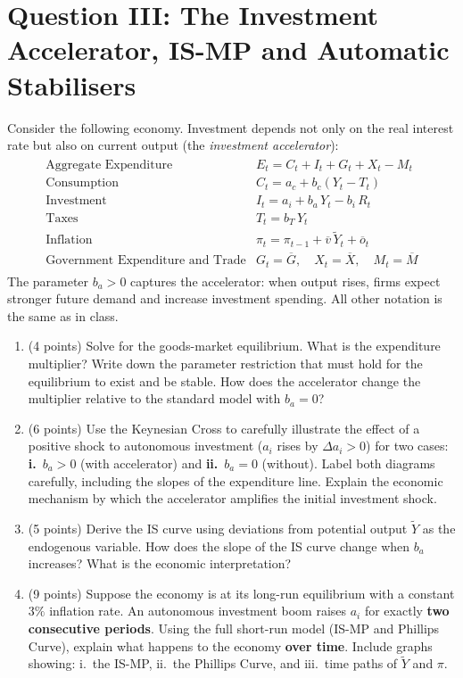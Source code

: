 \documentclass[letterpaper,12pt]{article}
\theoremstyle{dotlessS}
\begin{document}
\section*{Question III: The Investment Accelerator, IS-MP and Automatic Stabilisers}
Consider the following economy. Investment depends not only on the real interest rate but also on current output (the \emph{investment accelerator}):
\begin{eqnarray*}
\begin{array}{ll}
\text{Aggregate Expenditure} & E_t = C_t + I_t + G_t + X_t - M_t \\[1.4ex]
\text{Consumption} & C_t = a_c + b_c(Y_t - T_t) \\[1.4ex]
\text{Investment} & I_t = a_i + b_a\,Y_t - b_i\,R_t \\[1.4ex]
\text{Taxes} & T_t = b_T\,Y_t \\[1.4ex]
\text{Inflation} & \pi_t = \pi_{t-1} + \overline{v}\,\widetilde{Y}_t + \overline{o}_t \\[1.4ex]
\text{Government Expenditure and Trade} & G_t = \overline{G}, \quad X_t = \overline{X}, \quad M_t = \overline{M}
\end{array}
\end{eqnarray*}
The parameter $b_a > 0$ captures the accelerator: when output rises, firms expect stronger future demand and increase investment spending. All other notation is the same as in class.
\begin{enumerate}[label=(\alph*)]
\item (4 points) Solve for the goods-market equilibrium. What is the expenditure multiplier? Write down the parameter restriction that must hold for the equilibrium to exist and be stable. How does the accelerator change the multiplier relative to the standard model with $b_a = 0$?

\item (6 points) Use the Keynesian Cross to carefully illustrate the effect of a positive shock to autonomous investment ($a_i$ rises by $\Delta a_i > 0$) for two cases: \textbf{i.}~$b_a > 0$ (with accelerator) and \textbf{ii.}~$b_a = 0$ (without). Label both diagrams carefully, including the slopes of the expenditure line. Explain the economic mechanism by which the accelerator amplifies the initial investment shock.

\item (5 points) Derive the IS curve using deviations from potential output $\widetilde{Y}$ as the endogenous variable. How does the slope of the IS curve change when $b_a$ increases? What is the economic interpretation?

\item (9 points) Suppose the economy is at its long-run equilibrium with a constant $3\%$ inflation rate. An autonomous investment boom raises $a_i$ for exactly \textbf{two consecutive periods}. Using the full short-run model (IS-MP and Phillips Curve), explain what happens to the economy \textbf{over time}. Include graphs showing: i.~the IS-MP, ii.~the Phillips Curve, and iii.~time paths of $\widetilde{Y}$ and $\pi$.\\
\end{enumerate}
\end{document}
